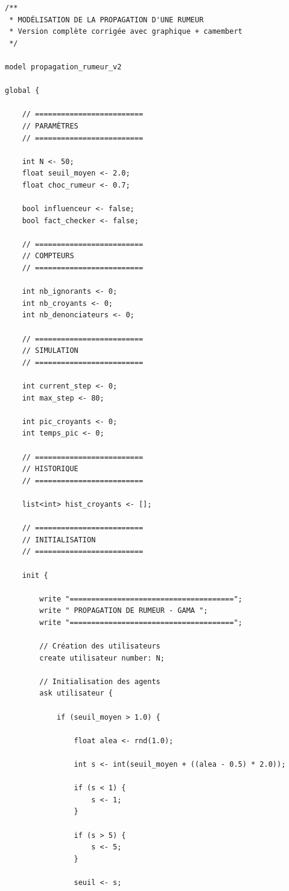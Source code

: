 \documentclass[11pt,a4paper]{article}
\begin{document}
\begin{small}\begin{verbatim}
/**
 * MODÉLISATION DE LA PROPAGATION D'UNE RUMEUR
 * Version complète corrigée avec graphique + camembert
 */

model propagation_rumeur_v2

global {

    // =========================
    // PARAMÈTRES
    // =========================

    int N <- 50;
    float seuil_moyen <- 2.0;
    float choc_rumeur <- 0.7;

    bool influenceur <- false;
    bool fact_checker <- false;

    // =========================
    // COMPTEURS
    // =========================

    int nb_ignorants <- 0;
    int nb_croyants <- 0;
    int nb_denonciateurs <- 0;

    // =========================
    // SIMULATION
    // =========================

    int current_step <- 0;
    int max_step <- 80;

    int pic_croyants <- 0;
    int temps_pic <- 0;

    // =========================
    // HISTORIQUE
    // =========================

    list<int> hist_croyants <- [];

    // =========================
    // INITIALISATION
    // =========================

    init {

        write "======================================";
        write " PROPAGATION DE RUMEUR - GAMA ";
        write "======================================";

        // Création des utilisateurs
        create utilisateur number: N;

        // Initialisation des agents
        ask utilisateur {

            if (seuil_moyen > 1.0) {

                float alea <- rnd(1.0);

                int s <- int(seuil_moyen + ((alea - 0.5) * 2.0));

                if (s < 1) {
                    s <- 1;
                }

                if (s > 5) {
                    s <- 5;
                }

                seuil <- s;


\end{verbatim}
\end{small}
\end{document}
